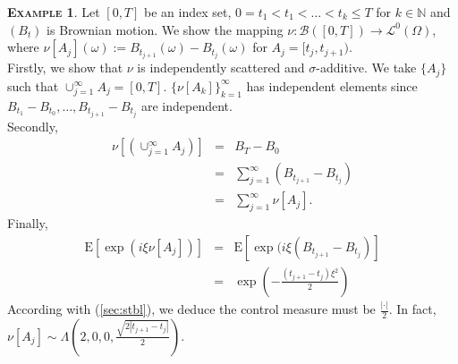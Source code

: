 \documentclass[a4paper, twoside, 11pt]{article}
\theoremstyle{definition}
\newtheorem{example}[definition]{\scshape Example}
\newcommand{\brkt}[1]{\left({#1} \right)}
\begin{document}
  \begin{example}
	Let $[0, T]$ be an index set, $0= t_1 < t_1 <\dots < t_k \le T$ for $k\in \mathbb{N}$ and $(B_{t})$ is Brownian motion.  We show the mapping $\nu : \mathscr{B}([0, T]) \rightarrow \mathcal{L}^0(\Omega)$, where $\nu[A_j](\omega):= B_{t_{j+1}}(\omega) - B_{t_{j}}(\omega)$ for $A_j=[t_{j}, t_{j+1})$.\\
	  Firstly, we show that $\nu$ is independently scattered and $\sigma$-additive. We take $\{A_j\}$ such that $\cup_{j=1}^{\infty}A_j = [0, T]$. $\{\nu[A_k]\}_{k=1}^{\infty}$ has independent elements since $B_{t_1} - B_{t_0}, \dots,  B_{t_{j+1}}- B_{t_{j}} $ are independent.\\
	  Secondly, 
	  \begin{eqnarray*}
		\nu[\brkt{\cup_{j=1}^{\infty}A_j}] &=& B_T - B_{0}\\
		&=& \sum_{j=1}^{\infty} (B_{t_{j+1}} - B_{t_j})\\
		&=& \sum_{j=1}^{\infty} \nu[A_j].
	  \end{eqnarray*}
	  Finally, 
	  \begin{eqnarray*}
		\mathrm{E}[\exp(i\xi\nu[A_j])] &=& \mathrm{E}[\exp(i\xi(B_{t_{j+1}} - B_{t_{j}})]\\
		&=& \exp(-\frac{(t_{j+1}-t_j)\xi^2}{2})
	  \end{eqnarray*}
	  According with (\ref{sec:stbl}), we deduce the control measure must be $\frac{|\cdot|}{2}$. In fact, $\nu[A_j] \sim \Lambda(2, 0, 0, \frac{\sqrt{2|t_{j+1} - t_j|}}{2})$.
	\label{sec:ex2}
  \end{example}
\end{document}
